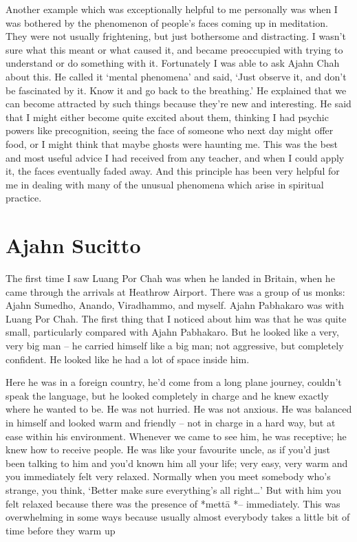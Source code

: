 Another example which was exceptionally helpful to me personally was
when I was bothered by the phenomenon of people's faces coming up in
meditation. They were not usually frightening, but just bothersome and
distracting. I wasn't sure what this meant or what caused it, and became
preoccupied with trying to understand or do something with it. 
Fortunately I was able to ask Ajahn Chah about this. He called it
`mental phenomena' and said, `Just observe it, and don't be fascinated
by it. Know it and go back to the breathing.' He explained that we can
become attracted by such things because they're new and interesting. He
said that I might either become quite excited about them, thinking I had
psychic powers like precognition, seeing the face of someone who next
day might offer food, or I might think that maybe ghosts were haunting
me. This was the best and most useful advice I had received from any
teacher, and when I could apply it, the faces eventually faded away. And
this principle has been very helpful for me in dealing with many of the
unusual phenomena which arise in spiritual practice. 

\section{Ajahn Sucitto}

The first time I saw Luang Por Chah was when he landed in Britain, when
he came through the arrivals at Heathrow Airport. There was a group of
us monks: Ajahn Sumedho, Anando, Viradhammo, and myself. Ajahn Pabhakaro
was with Luang Por Chah. The first thing that I noticed about him was
that he was quite small, particularly compared with Ajahn Pabhakaro. But
he looked like a very, very big man -- he carried himself like a big
man; not aggressive, but completely confident. He looked like he had a
lot of space inside him. 

Here he was in a foreign country, he'd come from a long plane journey, 
couldn't speak the language, but he looked completely in charge and he
knew exactly where he wanted to be. He was not hurried. He was not
anxious. He was balanced in himself and looked warm and friendly -- not
in charge in a hard way, but at ease within his environment. Whenever we
came to see him, he was receptive; he knew how to receive people. He was
like your favourite uncle, as if you'd just been talking to him and
you'd known him all your life; very easy, very warm and you immediately
felt very relaxed. Normally when you meet somebody who's strange, you
think, `Better make sure everything's all right\ldots{}' But with him
you felt relaxed because there was the presence of *mettā *--
immediately. This was overwhelming in some ways because usually almost
everybody takes a little bit of time before they warm up

